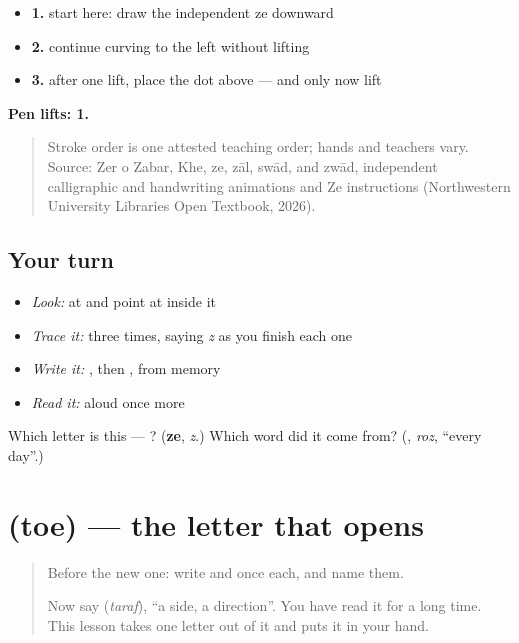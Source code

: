 \begin{itemize}
\raggedright
  \item \textbf{1.} start here: draw the independent ze downward
  \item \textbf{2.} continue curving to the left without lifting
  \item \textbf{3.} after one lift, place the dot above — and only now lift
\end{itemize}

\textbf{Pen lifts: 1.}

\begin{quote}
Stroke order is one attested teaching order; hands and teachers vary. Source: Zer o Zabar, Khe, ze, zāl, swād, and zwād, independent  calligraphic and handwriting animations and Ze instructions (Northwestern University Libraries Open Textbook, 2026).
\end{quote}

\subsection*{Your turn}
\begin{itemize}
\raggedright
  \item \emph{Look:} at \textbf{} and point at  inside it
  \item \emph{Trace it:}  three times, saying \emph{z} as you finish each one
  \item \emph{Write it:} , then , from memory
  \item \emph{Read it:} \textbf{} aloud once more
\end{itemize}

\begin{tcolorbox}[breakable,colback=teal!4,colframe=teal!35!black,title={Before you move on}]
Which letter is this — ? (\textbf{ze}, \emph{z}.) Which word did it come from? (\textbf{}, \emph{roz}, \textquotedblleft{}every day\textquotedblright{}.)
\end{tcolorbox}
\section[\texorpdfstring{\ur{ط} (toe)}{ط (toe)}]{ (toe) — the letter that opens }

\label{lesson:UR-W99-toe}



\begin{quote}
Before the new one: write  and  once each, and name them.

Now say \textbf{} (\emph{taraf}), \textquotedblleft{}a side, a direction\textquotedblright{}. You have read it for a long time. This lesson takes one letter out of it and puts it in your hand.
\end{quote}

